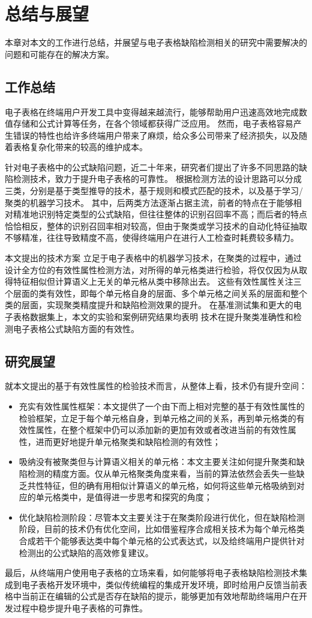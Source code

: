 \chapter{总结与展望}
本章对本文的工作进行总结，并展望与电子表格缺陷检测相关的研究中需要解决的问题和可能存在的解决方案。


\section{工作总结}
电子表格在终端用户开发工具中变得越来越流行，能够帮助用户迅速高效地完成数值存储和公式计算等任务，在各个领域都获得广泛应用。
然而，电子表格容易产生错误的特性也给许多终端用户带来了麻烦，给众多公司带来了经济损失，以及随着表格复杂化带来的较高的维护成本。

针对电子表格中的公式缺陷问题，近二十年来，研究者们提出了许多不同思路的缺陷检测技术，致力于提升电子表格的可靠性。
根据检测方法的设计思路可以分成三类，分别是基于类型推导的技术，基于规则和模式匹配的技术，以及基于学习/聚类的机器学习技术。
其中，后两类方法逐渐占据主流，前者的特点在于能够相对精准地识别特定类型的公式缺陷，但往往整体的识别召回率不高；而后者的特点恰恰相反，整体的识别召回率相对较高，但由于聚类或学习技术的自动化特征抽取不够精准，往往导致精度不高，使得终端用户在进行人工检查时耗费较多精力。

本文提出的技术方案 \wa 立足于电子表格中的机器学习技术\cu，在聚类的过程中，通过设计全方位的有效性属性检测方法，对所得的单元格类进行检验，将仅仅因为从取得特征相似但计算语义上无关的单元格从类中移除出去。
这些有效性属性关注三个层面的类有效性，即每个单元格自身的层面、多个单元格之间关系的层面和整个类的层面，实现聚类精度提升和缺陷检测效果的提升。
在基准测试集和更大的电子表格数据集上，本文的实验和案例研究结果均表明 \wa 技术在提升聚类准确性和检测电子表格公式缺陷方面的有效性。


\section{研究展望}
就本文提出的基于有效性属性的检验技术而言，从整体上看，\wa 技术仍有提升空间：
\begin{itemize}
    \item 充实有效性属性框架：本文提供了一个由下而上相对完整的基于有效性属性的检验框架，立足于每个单元格自身，到单元格之间的关系，再到单元格类的有效性属性，在整个框架中仍可以添加新的更加有效或者改进当前的有效性属性，进而更好地提升单元格聚类和缺陷检测的有效性；
    \item 吸纳没有被聚类但与计算语义相关的单元格：本文主要关注如何提升聚类和缺陷检测的精度方面。仅从单元格聚类角度来看，当前的算法依然会丢失一些缺乏共性特征，但的确有用相似计算语义的单元格，如何将这些单元格吸纳到对应的单元格类中，是值得进一步思考和探究的角度；
    \item 优化缺陷检测阶段：尽管本文主要关注于在聚类阶段进行优化，但在缺陷检测阶段，目前的技术仍有优化空间，比如借鉴程序合成相关技术为每个单元格类合成若干个能够表达类中每个单元格的公式表达式，以及给终端用户提供针对检测出的公式缺陷的高效修复建议。
\end{itemize}

最后，从终端用户使用电子表格的立场来看，如何能够将电子表格缺陷检测技术集成到电子表格开发环境中，类似传统编程的集成开发环境，即时给用户反馈当前表格中当前正在编辑的公式是否存在缺陷的提示，能够更加有效地帮助终端用户在开发过程中稳步提升电子表格的可靠性。
